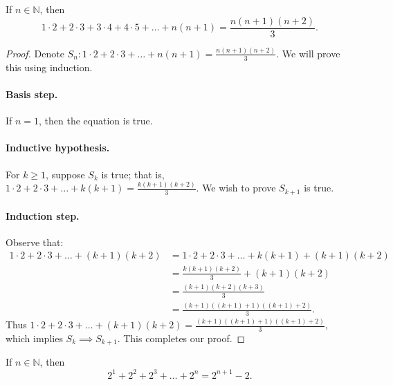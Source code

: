\documentclass{exam}
\begin{document}
\begin{proposition}{10.4}
    If $n\in\mathbb N$, then $$1\cdot2+2\cdot3+3\cdot4+4\cdot5+\dots+n(n+1)=\frac{n(n+1)(n+2)}3.$$
\end{proposition}

\begin{proof}
    Denote $S_n:1\cdot2+2\cdot3+\dots+n(n+1)=\frac{n(n+1)(n+2)}3$. We will prove this using induction.
    \paragraph{Basis step.} If $n=1$, then the equation is true.
    \paragraph{Inductive hypothesis.} For $k\ge 1$, suppose $S_k$ is true; that is, $1\cdot2+2\cdot3+\dots+k(k+1)=\frac{k(k+1)(k+2)}3$. We wish to prove $S_{k+1}$ is true.
    \paragraph{Induction step.} Observe that:
    \begin{align*}
        1\cdot2+2\cdot 3+\dots+(k+1)(k+2) &= 1\cdot2 + 2\cdot3 + \dots + k(k+1) + (k+1)(k+2)\\
        &= \frac{k(k+1)(k+2)}3+(k+1)(k+2)\\
        &=\frac{(k+1)(k+2)(k+3)}3\\
        &=\frac{(k+1)((k+1)+1)((k+1)+2)}3.
    \end{align*}
    Thus $1\cdot2+2\cdot 3+\dots+(k+1)(k+2)=\frac{(k+1)((k+1)+1)((k+1)+2)}3$, which implies $S_k\implies S_{k+1}$. This completes our proof.
\end{proof}

\begin{proposition}{10.5}
    If $n\in\mathbb N$, then $$2^1+2^2+2^3+\dots+2^n=2^{n+1}-2.$$
\end{proposition}
\end{document}
